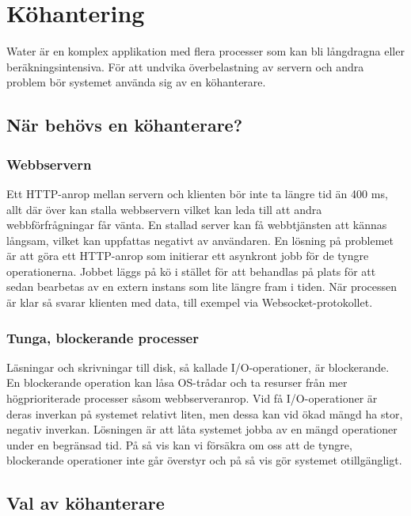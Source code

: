 \section{Köhantering}

Water är en komplex applikation med flera processer som kan bli långdragna eller beräkningsintensiva. För att undvika överbelastning av servern och andra problem bör systemet använda sig av en köhanterare.

\subsection{När behövs en köhanterare?}

\subsubsection{Webbservern}

Ett HTTP-anrop mellan servern och klienten bör inte ta längre tid än 400 ms, allt där över kan stalla webbservern vilket kan leda till att andra webbförfrågningar får vänta. En stallad server kan få webbtjänsten att kännas långsam, vilket kan uppfattas negativt av användaren.
En lösning på problemet är att göra ett HTTP-anrop som initierar ett asynkront jobb för de tyngre operationerna. Jobbet läggs på kö i stället för att behandlas på plats för att sedan bearbetas av en extern instans som lite längre fram i tiden. När processen är klar så svarar klienten med data, till exempel via Websocket-protokollet.

\subsubsection{Tunga, blockerande processer}

Läsningar och skrivningar till disk, så kallade I/O-operationer, är blockerande. En blockerande operation kan låsa OS-trådar och ta resurser från mer högprioriterade processer såsom webbserveranrop.
Vid få I/O-operationer är deras inverkan på systemet relativt liten, men dessa kan vid ökad mängd ha stor, negativ inverkan.
Lösningen är att låta systemet jobba av en mängd operationer under en begränsad tid. På så vis kan vi försäkra om oss att de tyngre, blockerande operationer inte går överstyr och på så vis gör systemet otillgängligt.

\subsection{Val av köhanterare}

